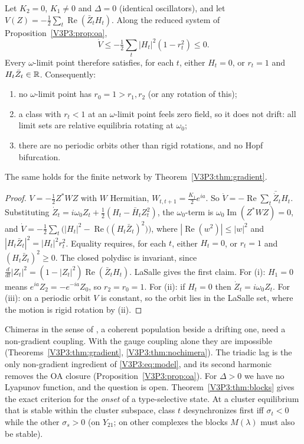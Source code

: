 \begin{theorem}\label{V3P3:thm:nochimera}
Let $K_2=0$, $K_1\ne0$ and $\Delta=0$ (identical oscillators), and let
$V(Z)=-\frac12\sum_t\operatorname{Re}(\bar Z_tH_t)$. Along the reduced system of
Proposition~\ref{V3P3:prop:oa},
\[
\dot V\le-\tfrac12\sum_t|H_t|^{2}(1-r_t^{2})\le0 .
\]
Every $\omega$-limit point therefore satisfies, for each $t$, either $H_t=0$, or $r_t=1$ and
$H_t\bar Z_t\in\mathbb{R}$. Consequently:
\begin{enumerate}
\item[(i)] no $\omega$-limit point has $r_0=1>r_1,r_2$ (or any rotation of this);
\item[(ii)] a class with $r_t<1$ at an $\omega$-limit point feels zero field, so it does not
drift: all limit sets are relative equilibria rotating at $\omega_0$;
\item[(iii)] there are no periodic orbits other than rigid rotations, and no Hopf
bifurcation.
\end{enumerate}
The same holds for the finite network by Theorem~\ref{V3P3:thm:gradient}.
\end{theorem}

\begin{proof}
$V=-\frac12Z^{*}WZ$ with $W$ Hermitian, $W_{t,t+1}=\frac{K_1}2e^{ia}$. So $\dot
V=-\operatorname{Re}\sum_t\bar{\dot Z}_tH_t$. Substituting $\dot
Z_t=i\omega_0Z_t+\frac12(H_t-\bar H_tZ_t^{2})$, the $\omega_0$-term is
$\omega_0\operatorname{Im}(Z^{*}WZ)=0$, and
$\dot V=-\frac12\sum_t\bigl(|H_t|^{2}-\operatorname{Re}\bigl((H_t\bar Z_t)^{2}\bigr)\bigr)$,
where $|\operatorname{Re}(w^{2})|\le|w|^{2}$ and $|H_t\bar Z_t|^{2}=|H_t|^{2}r_t^{2}$. Equality
requires, for each $t$, either $H_t=0$, or $r_t=1$ and $(H_t\bar Z_t)^{2}\ge0$. The closed polydisc is invariant,
since $\frac{d}{dt}|Z_t|^{2}=(1-|Z_t|^{2})\operatorname{Re}(\bar Z_tH_t)$. LaSalle
\cite{LaSalle60} gives the first claim. For (i): $H_1=0$ means $e^{ia}Z_2=-e^{-ia}Z_0$, so
$r_2=r_0=1$. For (ii): if $H_t=0$ then $\dot Z_t=i\omega_0Z_t$. For (iii): on a periodic
orbit $V$ is constant, so the orbit lies in the LaSalle set, where the motion is rigid
rotation by (ii).
\end{proof}

\begin{remark}\label{V3P3:rem:chimera}
Chimeras in the sense of \cite{KB02,AMSW08}, a coherent population beside a drifting one,
need a non-gradient coupling. With the gauge coupling alone they are impossible
(Theorems~\ref{V3P3:thm:gradient}, \ref{V3P3:thm:nochimera}). The triadic lag is the only
non-gradient ingredient of \eqref{V3P3:eq:model}, and its second harmonic removes the OA
closure (Proposition~\ref{V3P3:prop:oa}). For $\Delta>0$ we have no Lyapunov function, and
the question is open. Theorem~\ref{V3P3:thm:blocks} gives the exact criterion for the
\emph{onset} of a type-selective state. At a cluster equilibrium that is stable within the
cluster subspace, class $t$ desynchronizes first iff $\sigma_t<0$ while the other $\sigma_s>0$
(on $Y_{21}$; on other complexes the blocks $M(\lambda)$ must also be stable).
\end{remark}

